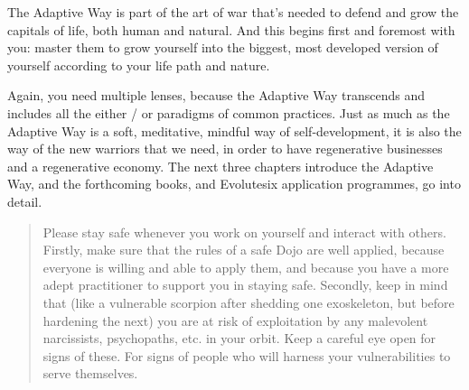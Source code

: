 The Adaptive Way is part of the art of war that’s needed to defend and grow the capitals of life, both human and natural. And this begins first and foremost with you: master them to grow yourself into the biggest, most developed version of yourself according to your life path and nature. 


Again, you need multiple lenses, because the Adaptive Way transcends and includes all the either / or paradigms of common practices. Just as much as the Adaptive Way is a soft, meditative, mindful way of self-development, it is also the way of the new warriors that we need, in order to have regenerative businesses and a regenerative economy. The next three chapters introduce the Adaptive Way, and the forthcoming books, and Evolutesix application programmes, go into detail. 


\begin{quotation}
Please stay safe whenever you work on yourself and interact with others. Firstly, make sure that the rules of a safe Dojo are well applied, because everyone is willing and able to apply them, and because you have a more adept practitioner to support you in staying safe. Secondly, keep in mind that (like a vulnerable scorpion after shedding one exoskeleton, but before hardening the next) you are at risk of exploitation by any malevolent narcissists, psychopaths, etc. in your orbit. Keep a careful eye open for signs of these. For signs of people who will harness your vulnerabilities to serve themselves.
\end{quotation}